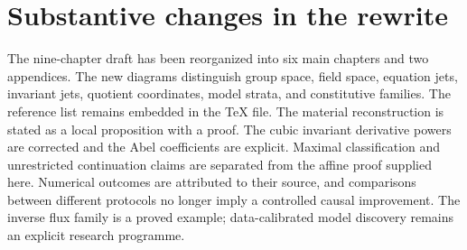 \documentclass[11pt,a4paper,oneside]{report}
\numberwithin{equation}{chapter}
\begin{document}
\section{Substantive changes in the rewrite}
The nine-chapter draft has been reorganized into six main chapters and two appendices. The new diagrams distinguish group space, field space, equation jets, invariant jets, quotient coordinates, model strata, and constitutive families. The reference list remains embedded in the TeX file. The material reconstruction is stated as a local proposition with a proof. The cubic invariant derivative powers are corrected and the Abel coefficients are explicit. Maximal classification and unrestricted continuation claims are separated from the affine proof supplied here. Numerical outcomes are attributed to their source, and comparisons between different protocols no longer imply a controlled causal improvement. The inverse flux family is a proved example; data-calibrated model discovery remains an explicit research programme.
\end{document}

